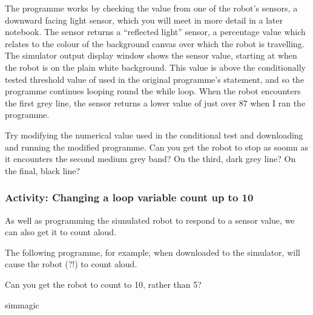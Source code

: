 \documentclass[letterpaper,10pt,english]{sphinxmanual}
\begin{document}
{The programme works by checking the value from one of the robot’s sensors, a downward facing light sensor, which you will meet in more detail in a later notebook. The sensor returns a “reflected light” sensor, a percentage value which relates to the colour of the background canvas over which the robot is travelling. The simulator output display window shows the sensor value, starting at  when the robot is on the plain white background. This value is above the conditionally tested
threshold value of  used in the original programme’s  statement, and so the programme continues looping round the while loop. When the robot encounters the first grey line, the sensor returns a lower value of just over 87 when I ran the programme.


Try modifying the numerical value used in the  conditional test and downloading and running the modified programme. Can you get the robot to stop as soomn as it encounters the second medium grey band? On the third, dark grey line? On the final, black line?


\subsubsection{Activity: Changing a loop variable count up to 10}
\label{\detokenize{content/02_Robot_Lab/Section_00_01:Activity:-Changing-a-loop-variable-count-up-to-10}}
As well as programming the siunulated robot to respond to a sensor value, we can also get it to count aloud.

The following programme, for example, when downloaded to the simulator, will cause the robot (?!) to count aloud.

Can you get the robot to count to 10, rather than 5?

{
\begin{sphinxVerbatim}[commandchars=\\\{\}]
\llap{\color{nbsphinxin}[ ]:\,\hspace{\fboxrule}\hspace{\fboxsep}}\PYGZpc{}\PYGZpc{}sim\PYGZus{}magic


\end{sphinxVerbatim}}}
\end{document}
